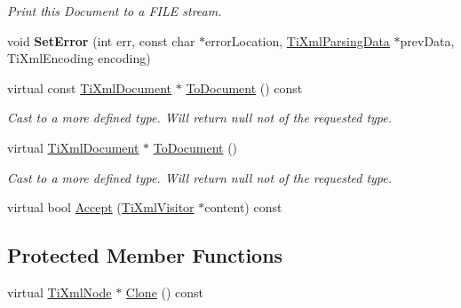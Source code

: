 \begin{DoxyCompactItemize}
\begin{DoxyCompactList}\small\item\em \-Print this \-Document to a \-F\-I\-L\-E stream. \end{DoxyCompactList}\item 
\hypertarget{classTiXmlDocument_a735c23e318597b920c94eae77fa206de}{void {\bfseries \-Set\-Error} (int err, const char $\ast$error\-Location, \hyperlink{classTiXmlParsingData}{\-Ti\-Xml\-Parsing\-Data} $\ast$prev\-Data, \-Ti\-Xml\-Encoding encoding)}\label{classTiXmlDocument_a735c23e318597b920c94eae77fa206de}

\item 
\hypertarget{classTiXmlDocument_a1dc977bde3e4fe85a8eb9d88a35ef5a4}{virtual const \hyperlink{classTiXmlDocument}{\-Ti\-Xml\-Document} $\ast$ \hyperlink{classTiXmlDocument_a1dc977bde3e4fe85a8eb9d88a35ef5a4}{\-To\-Document} () const }\label{classTiXmlDocument_a1dc977bde3e4fe85a8eb9d88a35ef5a4}

\begin{DoxyCompactList}\small\item\em \-Cast to a more defined type. \-Will return null not of the requested type. \end{DoxyCompactList}\item 
\hypertarget{classTiXmlDocument_a1025d942a1f328fd742d545e37efdd42}{virtual \hyperlink{classTiXmlDocument}{\-Ti\-Xml\-Document} $\ast$ \hyperlink{classTiXmlDocument_a1025d942a1f328fd742d545e37efdd42}{\-To\-Document} ()}\label{classTiXmlDocument_a1025d942a1f328fd742d545e37efdd42}

\begin{DoxyCompactList}\small\item\em \-Cast to a more defined type. \-Will return null not of the requested type. \end{DoxyCompactList}\item 
virtual bool \hyperlink{classTiXmlDocument_a3daab2f472418ef66315750202f762ae}{\-Accept} (\hyperlink{classTiXmlVisitor}{\-Ti\-Xml\-Visitor} $\ast$content) const 
\end{DoxyCompactItemize}
\subsection*{\-Protected \-Member \-Functions}
\begin{DoxyCompactItemize}
\item 
virtual \hyperlink{classTiXmlNode}{\-Ti\-Xml\-Node} $\ast$ \hyperlink{classTiXmlDocument_ac9e8f09b23454d953b32d1b65cd1409e}{\-Clone} () const 
\end{DoxyCompactItemize}



